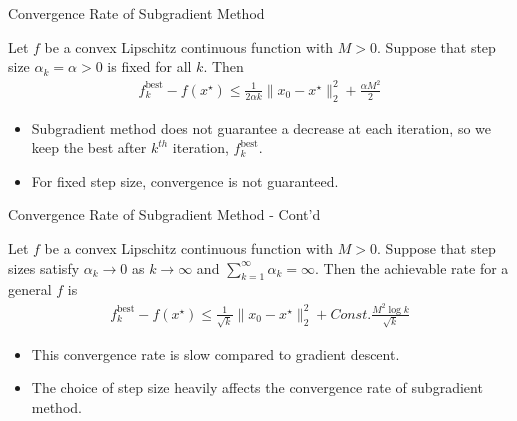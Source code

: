 \documentclass{beamer}
\begin{document}
\begin{frame}{Convergence Rate of Subgradient Method}
    \begin{theorem}
    Let $f$ be a convex Lipschitz continuous function with $M>0$. Suppose that step size $\alpha_k=\alpha > 0$ is fixed for all $k$. Then
    \begin{align*}
        f_k^{\text{best}}-f(x^\star)\leq\frac{1}{2\alpha k}\|x_0-x^\star\|_2^2+\frac{\alpha M^2}{2}
    \end{align*}
    \end{theorem}
    \pause\vspace{10pt}
    \begin{itemize}
        \item Subgradient method does not guarantee a decrease at each iteration, so we keep the best after $k^{th}$ iteration, $f_k^{\text{best}}$.
        \pause
        \item For fixed step size, convergence is not guaranteed.
    \end{itemize}
\end{frame}

\begin{frame}{Convergence Rate of Subgradient Method - Cont'd}
    \begin{theorem}
    Let $f$ be a convex Lipschitz continuous function with $M>0$. Suppose that step sizes satisfy $\alpha_k\rightarrow 0$ as $k\rightarrow\infty$ and $\sum_{k=1}^\infty\alpha_k=\infty$. Then the achievable rate for a general $f$ is
    \begin{align*}
        f_k^{\text{best}}-f(x^\star)\leq\frac{1}{\sqrt{k}}\|x_0-x^\star\|_2^2+Const.\frac{ M^2\log k}{\sqrt{k}}
    \end{align*}
    \end{theorem}
    \begin{itemize}
        \item This convergence rate is slow compared to gradient descent.
        \item The choice of step size heavily affects the convergence rate of subgradient method.
    \end{itemize}
\end{frame}
\end{document}
